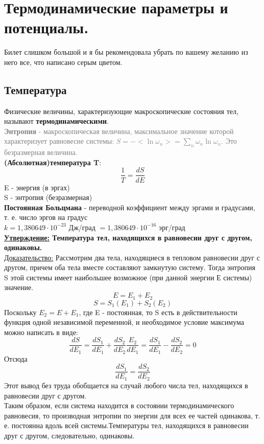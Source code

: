 \section {Термодинамические параметры и потенциалы.}
Билет слишком большой и я бы рекомендовала убрать по вашему желанию из него все, что написано серым цветом.
\subsection{Температура}
Физические величины, характеризующие макроскопические
состояния тел, называют \textbf{термодинамическими}.\\
\textcolor{gray}{
\textbf{Энтропия} - макроскопическая величина, максимальное значение которой характеризует равновесие системы: $S = -<\ln \omega_n> = \sum_{n} \omega_n \ln \omega_n$. Это безразмерная величина.\\
}
\textbf{(Абсолютная)температура T}: $$\frac{1}{T} = \frac{dS}{dE}$$ E - энергия (в эргах)\\
S - энтропия (безразмерная)\\
\textbf{Постоянная Больцмана} - переводной коэффициент между эргами и
градусами, т. е. число эргов на градус \\$k = 1,380649 \cdot 10^{-23} $ Дж/град $ = 1,380649 \cdot 10^{-16}$ эрг/град\\
\textbf{\underline{Утверждение:} Температура тел, находящихся в равновесии друг с другом, одинаковы.}\\
\underline{Доказательство:}
Рассмотрим два тела, находящиеся в тепловом равновесии
друг с другом, причем оба тела вместе составляют замкнутую
систему. Тогда энтропия S этой системы имеет наибольшее воз­можное (при данной энергии Е системы) значение.
$$
E = E_1 + E_2
$$
$$
S = S_1(E_1) + S_2(E_2)
$$
Поскольку $E_2 = E + E_1$, где E - постоянная, то S есть в действительности функция одной независимой пе­ременной, и необходимое условие максимума можно написать в виде:
$$
\frac{dS}{dE_1} = \frac{dS_1}{dE_1} + \frac{dS_2}{dE_2}\frac{E_2}{dE_1} = \frac{dS_1}{dE_1} - \frac{dS_2}{dE_2} = 0
$$
Отсюда
$$
\frac{dS_1}{dE_1} = \frac{dS_2}{dE_2}
$$
Этот вывод без труда обобщается на случай любого числа тел,
находящихся в равновесии друг с другом.\\
Таким образом, если система находится в состоянии термо­динамического равновесия, то производная энтропии по энер­гии для всех ее частей одинакова, т. е. постоянна вдоль всей
системы.Температуры тел, находящихся в равновесии друг с другом, сле­довательно, одинаковы.\\
